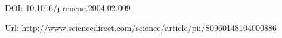 \documentclass[a4paper,12pt]{article}
\begin{document}
\thispagestyle{empty}

\vspace{3cm}

\nocite{Bianchi2004a}
\printbibliography

\vspace{3cm}
DOI: \href{https://doi.org/10.1016/j.renene.2004.02.009}{10.1016/j.renene.2004.02.009}

\vspace{1.5cm}
Url: \url{http://www.sciencedirect.com/science/article/pii/S0960148104000886}

\newpage

\end{document}
